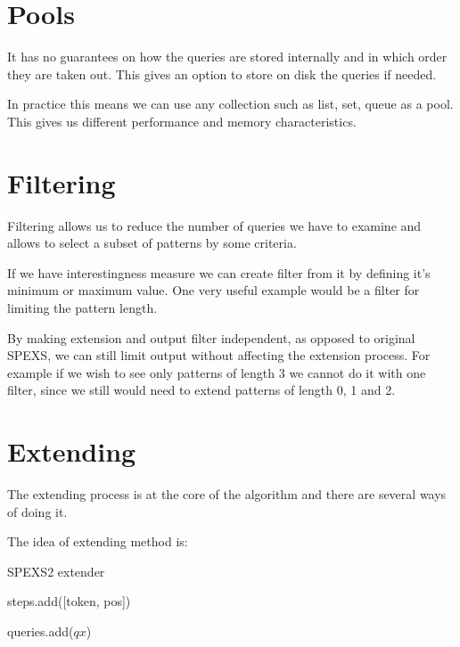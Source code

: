 \section{Pools}

It has no guarantees on how the queries are stored internally and in which order they are taken out. This gives an option to store on disk the queries if needed.

In practice this means we can use any collection such as list, set, queue as a pool. This gives us different performance and memory characteristics.

\section{Filtering}

Filtering allows us to reduce the number of queries we have to examine and allows to select a subset of patterns by some criteria. \eg

If we have interestingness measure we can create filter from it by defining it's minimum or maximum value. One very useful example would be a filter for limiting the pattern length. \eg

By making extension and output filter independent, as opposed to original SPEXS, we can still limit output without affecting the extension process. For example if we wish to see only patterns of length 3 we cannot do it with one filter, since we still would need to extend patterns of length 0, 1 and 2.

\section{Extending}

The extending process is at the core of the algorithm and there are several ways of doing it.



The idea of extending method is:

\begin{algorithm}[H]
	\caption{SPEXS2 extender}
\begin{algorithmic}[1]
	
		\State steps.add([token, pos])
	\EndFor

		\EndIf
	\EndFor

		\State queries.add($qx$)
	\EndFor
\end{algorithmic}
\end{algorithm}

